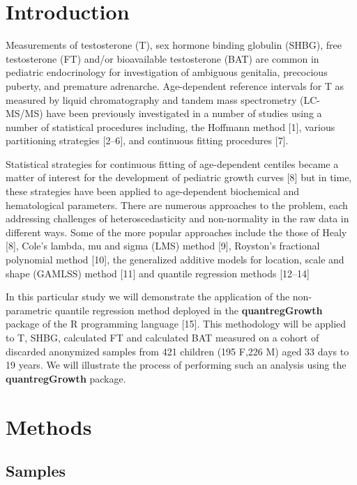 \documentclass[]{elsarticle} %
\begin{document}
\hypertarget{introduction}{%
\section{Introduction}\label{introduction}}

Measurements of testosterone (T), sex hormone binding globulin (SHBG),
free testosterone (FT) and/or bioavailable testosterone (BAT) are common
in pediatric endocrinology for investigation of ambiguous genitalia,
precocious puberty, and premature adrenarche. Age-dependent reference
intervals for T as measured by liquid chromatography and tandem mass
spectrometry (LC-MS/MS) have been previously investigated in a number of
studies using a number of statistical procedures including, the Hoffmann
method {[}1{]}, various partitioning strategies {[}2--6{]}, and
continuous fitting procedures {[}7{]}.

Statistical strategies for continuous fitting of age-dependent centiles
became a matter of interest for the development of pediatric growth
curves {[}8{]} but in time, these strategies have been applied to
age-dependent biochemical and hematological parameters. There are
numerous approaches to the problem, each addressing challenges of
heteroscedasticity and non-normality in the raw data in different ways.
Some of the more popular approaches include the those of Healy {[}8{]},
Cole's lambda, mu and sigma (LMS) method {[}9{]}, Royston's fractional
polynomial method {[}10{]}, the generalized additive models for
location, scale and shape (GAMLSS) method {[}11{]} and quantile
regression methods {[}12--14{]}

In this particular study we will demonstrate the application of the
non-parametric quantile regression method deployed in the
\textbf{quantregGrowth} package of the R programming language {[}15{]}.
This methodology will be applied to T, SHBG, calculated FT and
calculated BAT measured on a cohort of discarded anonymized samples from
421 children (195 F,226 M) aged 33 days to 19 years. We will illustrate
the process of performing such an analysis using the
\textbf{quantregGrowth} package.

\hypertarget{methods}{%
\section{Methods}\label{methods}}

\hypertarget{samples}{%
\subsection{Samples}\label{samples}}
\end{document}
